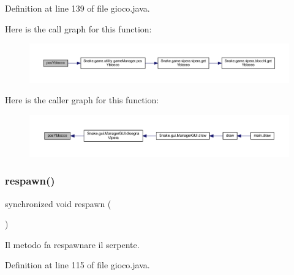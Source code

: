 Definition at line 139 of file gioco.\+java.

Here is the call graph for this function\+:
\nopagebreak
\begin{figure}[H]
\begin{center}
\leavevmode
\includegraphics[width=350pt]{class_snake_1_1game_1_1gioco_a6ced36b3bedd58f6363c964edb3b9b8d_cgraph}
\end{center}
\end{figure}
Here is the caller graph for this function\+:
\nopagebreak
\begin{figure}[H]
\begin{center}
\leavevmode
\includegraphics[width=350pt]{class_snake_1_1game_1_1gioco_a6ced36b3bedd58f6363c964edb3b9b8d_icgraph}
\end{center}
\end{figure}
\mbox{\label{class_snake_1_1game_1_1gioco_acfb7d9e73cb8326f2ebf9e9cbfde836a}} 
\subsubsection{\texorpdfstring{respawn()}{respawn()}}
{\footnotesize\ttfamily synchronized void respawn (\begin{DoxyParamCaption}{ }\end{DoxyParamCaption})}



Il metodo fa respawnare il serpente. 



Definition at line 115 of file gioco.\+java.

